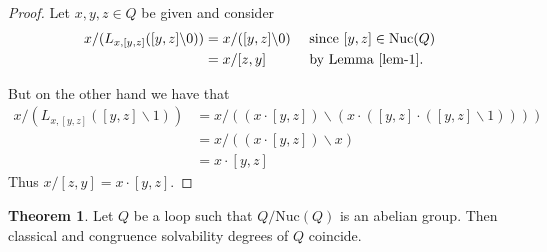 \documentclass[12pt]{report}
\theoremstyle{definition}
\newtheorem{thm}{Theorem}[chapter]
\newcommand{\ldv}{\backslash}       %
\newcommand{\rdv}{/}                %
\newcommand{\nuc}{\text{Nuc}}       %
\begin{document}
\begin{proof}
  Let $x, y, z\in Q$ be given and consider
  \begin{alignat*}{2}
    x\rdv(L_{x, [y, z]}([y, z]\ldv 0)) &= x\rdv([y, z]\ldv 0) &&\text{ since $[y, z]\in\nuc(Q)$}\\
    &= x\rdv [z, y] &&\text{ by Lemma \ref{lem-1}.}
  \end{alignat*}

  But on the other hand we have that
  \begin{align*}
    x\rdv(L_{x, [y, z]}([y, z]\ldv 1)) &= x\rdv((x\cdot [y, z])\ldv (x\cdot ([y, z]\cdot([y, z]\ldv 1))))\\
    &= x\rdv((x\cdot [y, z])\ldv x)\\
    &= x\cdot [y, z]
  \end{align*}
  Thus $x\rdv[z, y] = x\cdot [y, z]$.
\end{proof}

\begin{thm}
  Let $Q$ be a loop such that $Q/\nuc(Q)$ is an abelian group. Then classical and congruence
    solvability degrees of $Q$ coincide.
\end{thm}
\end{document}
